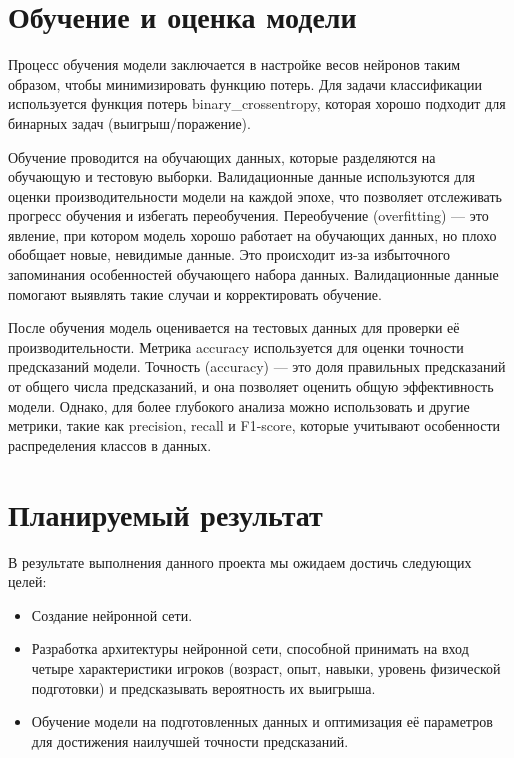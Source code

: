 \documentclass[12pt,a4paper]{article}
\begin{document}
\section{Обучение и оценка модели}

Процесс обучения модели заключается в настройке весов нейронов таким образом, чтобы минимизировать функцию потерь. Для задачи классификации используется функция потерь binary\_crossentropy, которая хорошо подходит для бинарных задач (выигрыш/поражение).

Обучение проводится на обучающих данных, которые разделяются на обучающую и тестовую выборки. Валидационные данные используются для оценки производительности модели на каждой эпохе, что позволяет отслеживать прогресс обучения и избегать переобучения. Переобучение (overfitting) — это явление, при котором модель хорошо работает на обучающих данных, но плохо обобщает новые, невидимые данные. Это происходит из-за избыточного запоминания особенностей обучающего набора данных. Валидационные данные помогают выявлять такие случаи и корректировать обучение.

После обучения модель оценивается на тестовых данных для проверки её производительности. Метрика accuracy используется для оценки точности предсказаний модели. Точность (accuracy) — это доля правильных предсказаний от общего числа предсказаний, и она позволяет оценить общую эффективность модели. Однако, для более глубокого анализа можно использовать и другие метрики, такие как precision, recall и F1-score, которые учитывают особенности распределения классов в данных.

\section{Планируемый результат}
В результате выполнения данного проекта мы ожидаем достичь следующих целей:
\begin{itemize}
    \item Создание нейронной сети.
    \item Разработка архитектуры нейронной сети, способной принимать на вход четыре характеристики игроков (возраст, опыт, навыки, уровень физической подготовки) и предсказывать вероятность их выигрыша.
    \item Обучение модели на подготовленных данных и оптимизация её параметров для достижения наилучшей точности предсказаний.
\end{itemize}
\end{document}
